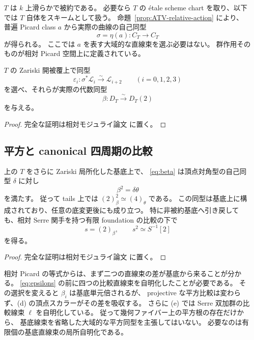 $T$ は $k$ 上滑らかで被約である。
必要なら $T$ の étale scheme chart を取り、以下では $T$ 自体をスキームとして扱う。
命題~\ref{prop:ATV-relative-action} により、
普遍 Picard class $a$ から実際の曲線の自己同型
\[
 \sigma=\eta(a):C_T\longrightarrow C_T
 \tag{PR-6}\label{eq:sigma}
\]
が得られる。
ここでは $a$ を表す大域的な直線束を選ぶ必要はない。
群作用そのものが相対 Picard 空間上に定義されている。

\begin{lemma}[線束の比較と二周期]\label{lem:relative-beta}
$T$ の Zariski 開被覆上で同型
\[
 \varepsilon_i:\sigma^*\mathcal L_i\xrightarrow{\sim}\mathcal L_{i+2}
 \qquad(i=0,1,2,3)
 \tag{PR-7}\label{eq:epsilons}
\]
を選べ、それらが実際の代数同型
\[
 \beta:D_T\xrightarrow{\sim}D_T(2)
 \tag{PR-8}\label{eq:beta}
\]
を与える。
\end{lemma}

\begin{proof}
完全な証明は相対モジュライ論文 \cite[\texttt{relative_picard_roots}]{QuadricModuli2026} に置く。
\end{proof}

\subsection{平方と canonical 四周期の比較}

\begin{theorem}\label{thm:relative-compatible-root}
上の $T$ をさらに Zariski 局所化した基底上で、
\eqref{eq:beta} は頂点対角型の自己同型 $\delta$ に対し
\[
 \beta^2=\delta\theta
 \tag{PR-9}\label{eq:beta-square}
\]
を満たす。
従って tails 上では $(2)_\beta^2\simeq(4)_\theta$ である。
この同型は基底上に構成されており、任意の底変更後にも成り立つ。
特に非被約基底へ引き戻しても、相対 Serre 関手を持つ有限 foundation の比較の下で
\[
 s=(2)_\beta,\qquad s^2\simeq S^{-1}[2]
 \tag{PR-10}\label{eq:Serre-square}
\]
を得る。
\end{theorem}

\begin{proof}
完全な証明は相対モジュライ論文 \cite[\texttt{relative_picard_roots}]{QuadricModuli2026} に置く。
\end{proof}



\begin{remark}[比較線束の局所自明化]
相対 Picard の等式からは、まず二つの直線束の差が基底から来ることが分かる。
\eqref{eq:epsilons} の前に四つの比較直線束を自明化したことが必要である。
その選択を変えると $\beta_i$ は基底単元倍されるが、
projective な平方比較は変わらず、(d) の頂点スカラーがその差を吸収する。
さらに (e) では Serre 双加群の比較線束 $\ell$ を自明化している。
従って幾何ファイバー上の平方根の存在だけから、
基底線束を省略した大域的な平方同型を主張してはいない。
必要なのは有限個の基底直線束の局所自明化である。
\end{remark}

